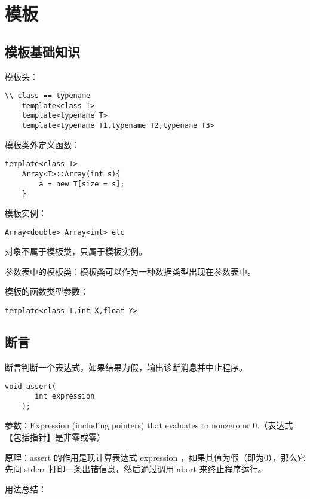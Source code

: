 \chapter{模板}
\newpage

\section{模板基础知识}

模板头：
\begin{lstlisting}[frame=shadowbox]
    \\ class == typename
    template<class T>
    template<typename T>
    template<typename T1,typename T2,typename T3>
\end{lstlisting}

模板类外定义函数：
\begin{lstlisting}[frame=shadowbox]
    template<class T>
    Array<T>::Array(int s){
        a = new T[size = s];
    }
\end{lstlisting}

模板实例：
\begin{lstlisting}[frame=shadowbox]
    Array<double> Array<int> etc
\end{lstlisting}

对象不属于模板类，只属于模板实例。

参数表中的模板类：模板类可以作为一种数据类型出现在参数表中。

模板的函数类型参数：
\begin{lstlisting}[frame=shadowbox]
    template<class T,int X,float Y>
\end{lstlisting}

\section{断言}

断言判断一个表达式，如果结果为假，输出诊断消息并中止程序。

\begin{lstlisting}[frame=shadowbox]
    void assert( 
       int expression 
    );
\end{lstlisting}

参数：Expression (including pointers) that evaluates to nonzero or 0.（表达式【包括指针】是非零或零）

原理：assert 的作用是现计算表达式 expression ，如果其值为假（即为0），那么它先向 stderr 打印一条出错信息，然后通过调用 abort 来终止程序运行。

用法总结：

